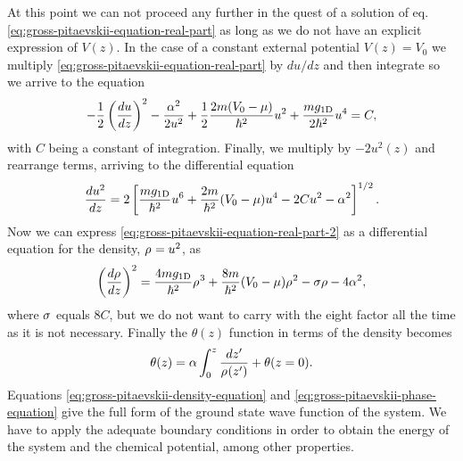 At this point we can not proceed any further in the quest of a solution of eq.
\eqref{eq:gross-pitaevskii-equation-real-part} as long as we do not have an explicit expression of $V(z)$.
In the case of a constant external potential $V(z) = V_0$ we multiply \eqref{eq:gross-pitaevskii-equation-real-part} by $du / dz$ and then integrate so we arrive to the equation
%
\begin{equation}
	-\frac{1}{2} \left( \frac{du}{dz} \right)^2 - \frac{\alpha^2}{2 u^2} + \frac{1}{2} \frac{2m (V_0 - \mu)}{\hbar^2} u^2 + \frac{m g_{ \mathrm{1D} }}{2 \hbar^2} u^4 = C,
\end{equation}
%
with $C$ being a constant of integration. Finally, we multiply by $-2u^2(z)$ and rearrange
terms, arriving to the differential equation
%
\begin{equation}
	\label{eq:gross-pitaevskii-equation-real-part-2}
	\frac{d u^2}{dz} = 2 \left[ \frac{m g_{ \mathrm{1D} }}{\hbar^2} u^6 + \frac{2m}{\hbar^2} (V_0 - \mu) u^4 - 2 C u^2 - \alpha^2  \right]^{1/2}.
\end{equation}
%
Now we can express \eqref{eq:gross-pitaevskii-equation-real-part-2} as a differential equation for the density, ${\rho_{}} = u^2$, as
%
\begin{align}
	\label{eq:gross-pitaevskii-density-equation}
	\left( \frac{d{\rho_{}}}{dz} \right)^2 = \frac{4 m g_{ \mathrm{1D} }}{\hbar^2} {\rho_{}}^3 + \frac{8 m}{\hbar^2} (V_0 - \mu) {\rho_{}}^2 - \sigma \rho - 4\alpha^2,
\end{align}
%
where $\sigma$ equals $8C$, but we do not want to carry with the eight factor all the time as it is
not necessary. Finally the $\theta(z)$ function in terms of the density becomes
%
\begin{equation}
	\label{eq:gross-pitaevskii-phase-equation}
	\theta(z) = \alpha \int_{0}^{z} \frac{dz'}{{\rho_{}}(z')} + \theta(z=0).
\end{equation}
%
Equations \eqref{eq:gross-pitaevskii-density-equation} and \eqref{eq:gross-pitaevskii-phase-equation} give the full form of
the ground state wave function of the system. We have to apply the adequate boundary conditions
in order to obtain the energy of the system and the chemical potential, among other properties.

